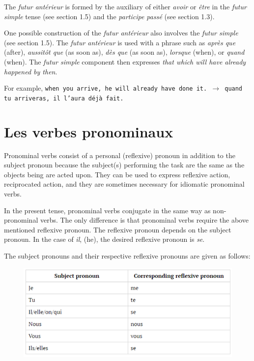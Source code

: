 \documentclass[11pt, oneside]{book}
\begin{document}
{{The \textit{futur ant\'erieur} is formed by the auxiliary of either \textit{avoir} or \textit{\^etre} in the \textit{futur simple} tense (see section 1.5) and the \textit{participe pass\'e} (see section 1.3). \vspace{0.5\baselineskip} 

One possible construction of the \textit{futur ant\'erieur} also involves the \textit{futur simple} (see section 1.5). The \textit{futur ant\'erieur} is used with a phrase such as \textit{apr\`es que} (after), \textit{aussit\^ot que} (as soon as), \textit{d\`es que} (as soon as), \textit{lorsque} (when), or \textit{quand} (when). The \textit{futur simple} component then expresses \textit{that which will have already happened by then}. \vspace{0.5\baselineskip}

For example, \texttt{when you arrive, he will already have done it. $\rightarrow$ quand tu arriveras, il l'aura d\'ej\`a fait.}

\section{Les verbes pronominaux}

Pronominal verbs consist of a personal (reflexive) pronoun in addition to the subject pronoun because the subject(s) performing the task are the same as the objects being are acted upon.  They can be used to express reflexive action, reciprocated action, and they are sometimes necessary for idiomatic pronominal verbs. \vspace{0.25\baselineskip}

In the present tense, pronominal verbs conjugate in the same way as non-pronominal verbs. The only difference is that pronominal verbs require the above mentioned reflexive pronoun. The reflexive pronoun depends on the subject pronoun. In the case of \textit{il}, (he), the desired reflexive pronoun is \textit{se}.  \vspace{0.5\baselineskip}

\newpage The subject pronouns and their respective reflexive pronouns are given as follows:

\begin{figure}[H]
	\includegraphics[scale=0.6]{charts/reflexivePronouns.png}
\end{figure} \vspace{0.5\baselineskip} 

}}
\end{document}
